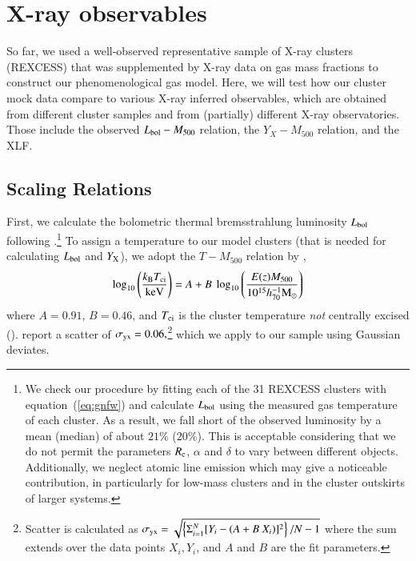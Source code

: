 \documentclass[useAMS,usenatbib]{mn2e}
\begin{document}
\section{X-ray  observables}
\label{sec:4}

So far, we used a well-observed representative sample of X-ray clusters
(REXCESS) that was supplemented by X-ray data on gas mass fractions to construct
our phenomenological gas model.  Here, we will test how our cluster mock data
compare to various X-ray inferred observables, which are obtained from different
cluster samples and from (partially) different X-ray observatories. Those
include the observed $L_{{\mathrm{bol}}} - M_{500}$ relation, the $Y_X - M_{500}$
relation, and the XLF.

\subsection{Scaling Relations}

First, we calculate the bolometric thermal bremsstrahlung luminosity
$L_{{\mathrm{bol}}}$ following \cite{1988xrec.book.....S}.\footnote{We check our
  procedure by fitting each of the 31 REXCESS clusters with
  equation~(\ref{eq:gnfw}) and calculate $L_{{\mathrm{bol}}}$ using the measured gas
  temperature of each cluster. As a result, we fall short of the observed
  luminosity by a mean (median) of about $21\%$ ($20\%$). This is acceptable
  considering that we do not permit the parameters $R_{{\mathrm{c}}}$, $\alpha$ and
  $\delta$ to vary between different objects. Additionally, we neglect atomic
  line emission which may give a noticeable contribution, in particularly for
  low-mass clusters and in the cluster outskirts of larger systems.}  To assign
a temperature to our model clusters (that is needed for calculating
$L_{{\mathrm{bol}}}$ and $Y_{{\mathrm{X}}}$), we adopt the $T-M_{500}$ relation by
\cite{2010MNRAS.406.1773M},
\begin{equation}
\log_{10} \left( \frac{k_{{\mathrm{B}}}T_{{\mathrm{ci}}}}{{\mathrm{keV}}} \right) = 
A + B~\log_{10} \left( \frac{E(z) M_{500}}{10^{15} h_{70}^{-1} {\mathrm{M_{\odot}}}} \right)
\label{eq:temp}
\end{equation}
where $A=0.91$, $B=0.46$, and $T_{{\mathrm{ci}}}$ is the cluster temperature
\emph{not} centrally excised
(\citealp{2010MNRAS.406.1773M}). \cite{2010MNRAS.406.1773M} report a scatter of
$\sigma_{{\mathrm{yx}}} = 0.06,$\footnote{Scatter is calculated as $\sigma_{{\mathrm{yx}}}
  = \sqrt{ \left\{ \Sigma_{i=1}^{N} [Y_{i}-(A+B~X_{i})]^{2}\right\} / N-1}$
  where the sum extends over the data points $X_{i}, Y_{i}$, and $A$ and $B$ are
  the fit parameters.} which we apply to our sample using Gaussian deviates.
\end{document}
